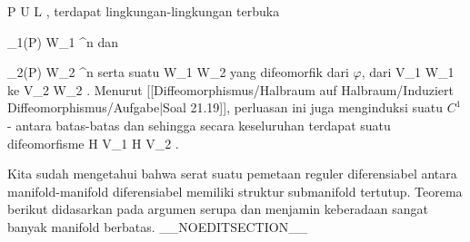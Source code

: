 {\mavergleichskette
{\vergleichskette
{ P
}
{ \in }{ U \cap L
}
{  }{
}
{    }{
}
{   }{
}
}
{}{}{,}
terdapat lingkungan-lingkungan terbuka

\mavergleichskette
{\vergleichskette
{ \alpha_1(P)
}
{ \in }{ W_1
}
{ \subseteq }{ \R^n
}
{    }{
}
{   }{
}
}
{}{}{}
dan

\mavergleichskette
{\vergleichskette
{ \alpha_2(P)
}
{ \in }{ W_2
}
{ \subseteq }{ \R^n
}
{    }{
}
{   }{
}
}
{}{}{}
serta suatu
\maabbdisp {\tilde{\varphi}} { W_1 } { W_2
} {}
yang difeomorfik dari $\varphi$, dari
\mathkor {} {V_1 \cap W_1} {ke} {V_2 \cap W_2} {.}
Menurut [[Diffeomorphismus/Halbraum auf Halbraum/Induziert Diffeomorphismus/Aufgabe|Soal 21.19]], perluasan ini juga menginduksi suatu
$C^1$-
antara batas-batas
 dan
 sehingga secara keseluruhan terdapat suatu difeomorfisme
 { \partial H \cap V_1 } { \partial H \cap V_2
} {.}

}

Kita sudah mengetahui bahwa serat suatu pemetaan reguler diferensiabel antara manifold-manifold diferensiabel memiliki struktur submanifold tertutup. Teorema berikut didasarkan pada argumen serupa dan menjamin keberadaan sangat banyak manifold berbatas.
__NOEDITSECTION__

